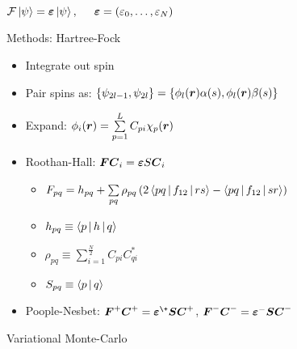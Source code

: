 \documentclass[10pt, t]{beamer}
\begin{document}
{
\begin{frame}[standout]
    $\mathcal{F}\ket{\psi} = \boldsymbol{{\varepsilon}}\ket{\psi},\hspace{0.5cm}
    \boldsymbol{{\varepsilon}}=(\varepsilon_0,\dots,\varepsilon_N)$
\end{frame}}

\begin{frame}[fragile]{Methods: Hartree-Fock}
    \begin{itemize}[<+->]
        \item Integrate out spin
        \item Pair spins as: $\{\psi_{2l-1}, \psi_{2l}\} =
            \{\phi_l(\boldsymbol{{r}})\alpha(s),\phi_l(\boldsymbol{{r}})\beta(s)\}$
        \item Expand: $\phi_i(\boldsymbol{{r}}) = \sum\limits^L_{p=1} C_{pi}\chi_p(\boldsymbol{{r}})$
        \item Roothan-Hall: $\boldsymbol{{F}}\boldsymbol{{C}}_i = \boldsymbol{{\varepsilon}}S\boldsymbol{{C}}_i$
            \begin{itemize}[<4->]
                \item $F_{pq} = h_{pq} +
                    \sum\limits_{pq}\rho_{pq}\left(2\Braket{pq | f_{12} | rs} -
                    \Braket{pq | f_{12} | sr}\right)$
                \vsp
                \item $h_{pq} \equiv \Braket{p | h | q}$
                \vsp
                \item $\rho_{pq} \equiv \sum\limits^{\frac{N}{2}}_{i=1} C_{pi}C^{*}_{qi}$
                \vsp
                \item $S_{pq} \equiv \Braket{p | q}$
            \end{itemize}
        \item Poople-Nesbet: $\blds{F}^{+}\blds{C}^{+} =
            \blds{\veps}^{\+}\blds{S}\blds{C}^{+}$, $\boldsymbol{{F}}^{-}\boldsymbol{{C}}^{-} =
            \boldsymbol{{\varepsilon}}^{-}\boldsymbol{{S}}\boldsymbol{{C}}^{-}$
    \end{itemize}
\end{frame}

{
\begin{frame}[standout]
    Variational Monte-Carlo
\end{frame}}
\end{document}
